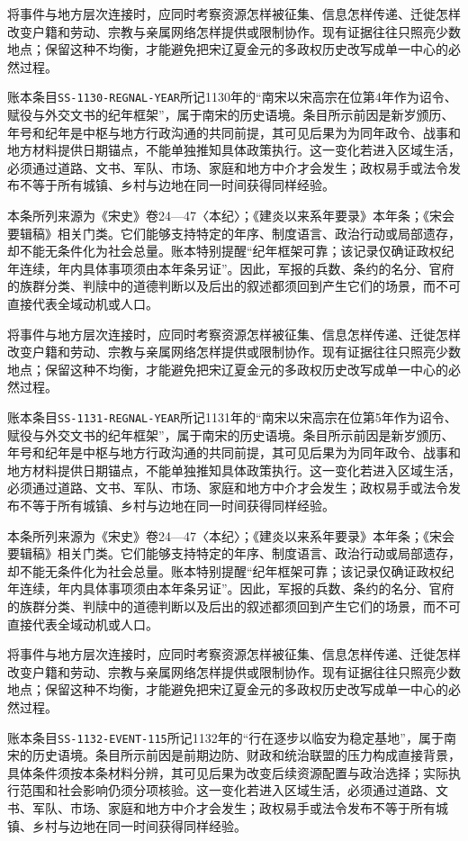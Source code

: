 将事件与地方层次连接时，应同时考察资源怎样被征集、信息怎样传递、迁徙怎样改变户籍和劳动、宗教与亲属网络怎样提供或限制协作。现有证据往往只照亮少数地点；保留这种不均衡，才能避免把宋辽夏金元的多政权历史改写成单一中心的必然过程。

账本条目\texttt{SS-1130-REGNAL-YEAR}所记1130年的“南宋以宋高宗在位第4年作为诏令、赋役与外交文书的纪年框架”，属于南宋的历史语境。条目所示前因是新岁颁历、年号和纪年是中枢与地方行政沟通的共同前提，其可见后果为为同年政令、战事和地方材料提供日期锚点，不能单独推知具体政策执行。这一变化若进入区域生活，必须通过道路、文书、军队、市场、家庭和地方中介才会发生；政权易手或法令发布不等于所有城镇、乡村与边地在同一时间获得同样经验。

本条所列来源为《宋史》卷24—47〈本纪〉；《建炎以来系年要录》本年条；《宋会要辑稿》相关门类。它们能够支持特定的年序、制度语言、政治行动或局部遗存，却不能无条件化为社会总量。账本特别提醒“纪年框架可靠；该记录仅确证政权纪年连续，年内具体事项须由本年条另证”。因此，军报的兵数、条约的名分、官府的族群分类、判牍中的道德判断以及后出的叙述都须回到产生它们的场景，而不可直接代表全域动机或人口。

将事件与地方层次连接时，应同时考察资源怎样被征集、信息怎样传递、迁徙怎样改变户籍和劳动、宗教与亲属网络怎样提供或限制协作。现有证据往往只照亮少数地点；保留这种不均衡，才能避免把宋辽夏金元的多政权历史改写成单一中心的必然过程。

账本条目\texttt{SS-1131-REGNAL-YEAR}所记1131年的“南宋以宋高宗在位第5年作为诏令、赋役与外交文书的纪年框架”，属于南宋的历史语境。条目所示前因是新岁颁历、年号和纪年是中枢与地方行政沟通的共同前提，其可见后果为为同年政令、战事和地方材料提供日期锚点，不能单独推知具体政策执行。这一变化若进入区域生活，必须通过道路、文书、军队、市场、家庭和地方中介才会发生；政权易手或法令发布不等于所有城镇、乡村与边地在同一时间获得同样经验。

本条所列来源为《宋史》卷24—47〈本纪〉；《建炎以来系年要录》本年条；《宋会要辑稿》相关门类。它们能够支持特定的年序、制度语言、政治行动或局部遗存，却不能无条件化为社会总量。账本特别提醒“纪年框架可靠；该记录仅确证政权纪年连续，年内具体事项须由本年条另证”。因此，军报的兵数、条约的名分、官府的族群分类、判牍中的道德判断以及后出的叙述都须回到产生它们的场景，而不可直接代表全域动机或人口。

将事件与地方层次连接时，应同时考察资源怎样被征集、信息怎样传递、迁徙怎样改变户籍和劳动、宗教与亲属网络怎样提供或限制协作。现有证据往往只照亮少数地点；保留这种不均衡，才能避免把宋辽夏金元的多政权历史改写成单一中心的必然过程。

账本条目\texttt{SS-1132-EVENT-115}所记1132年的“行在逐步以临安为稳定基地”，属于南宋的历史语境。条目所示前因是前期边防、财政和统治联盟的压力构成直接背景，具体条件须按本条材料分辨，其可见后果为改变后续资源配置与政治选择；实际执行范围和社会影响仍须分项核验。这一变化若进入区域生活，必须通过道路、文书、军队、市场、家庭和地方中介才会发生；政权易手或法令发布不等于所有城镇、乡村与边地在同一时间获得同样经验。

